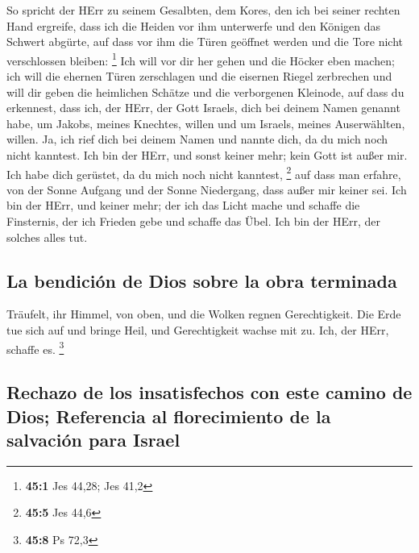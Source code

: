  So spricht der HErr zu seinem Gesalbten, dem Kores, den
ich bei seiner rechten Hand ergreife, dass ich die Heiden vor ihm
unterwerfe und den Königen das Schwert abgürte, auf dass vor ihm die
Türen geöffnet werden und die Tore nicht verschlossen bleiben:
\footnote{\textbf{45:1} Jes 44,28; Jes 41,2}  Ich will vor
dir her gehen und die Höcker eben machen; ich will die ehernen Türen
zerschlagen und die eisernen Riegel zerbrechen  und will
dir geben die heimlichen Schätze und die verborgenen Kleinode, auf dass
du erkennest, dass ich, der HErr, der Gott Israels, dich bei deinem
Namen genannt habe,  um Jakobs, meines Knechtes, willen
und um Israels, meines Auserwählten, willen. Ja, ich rief dich bei
deinem Namen und nannte dich, da du mich noch nicht kanntest.
 Ich bin der HErr, und sonst keiner mehr; kein Gott ist
außer mir. Ich habe dich gerüstet, da du mich noch nicht kanntest,
\footnote{\textbf{45:5} Jes 44,6}  auf dass man erfahre,
von der Sonne Aufgang und der Sonne Niedergang, dass außer mir keiner
sei. Ich bin der HErr, und keiner mehr;  der ich das Licht
mache und schaffe die Finsternis, der ich Frieden gebe und schaffe das
Übel. Ich bin der HErr, der solches alles tut.

\hypertarget{la-bendiciuxf3n-de-dios-sobre-la-obra-terminada}{%
\subsection{La bendición de Dios sobre la obra
terminada}\label{la-bendiciuxf3n-de-dios-sobre-la-obra-terminada}}

 Träufelt, ihr Himmel, von oben, und die Wolken regnen
Gerechtigkeit. Die Erde tue sich auf und bringe Heil, und Gerechtigkeit
wachse mit zu. Ich, der HErr, schaffe es. \footnote{\textbf{45:8} Ps
  72,3}

\hypertarget{rechazo-de-los-insatisfechos-con-este-camino-de-dios-referencia-al-florecimiento-de-la-salvaciuxf3n-para-israel}{%
\subsection{Rechazo de los insatisfechos con este camino de Dios;
Referencia al florecimiento de la salvación para
Israel}\label{rechazo-de-los-insatisfechos-con-este-camino-de-dios-referencia-al-florecimiento-de-la-salvaciuxf3n-para-israel}}

